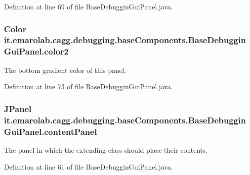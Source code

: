 Definition at line 69 of file Base\-Debuggin\-Gui\-Panel.\-java.

\hypertarget{classit_1_1emarolab_1_1cagg_1_1debugging_1_1baseComponents_1_1BaseDebugginGuiPanel_a97cc1e5698f78bfc568be30173e15d65}{
\subsubsection[{color2}]{\setlength{\rightskip}{0pt plus 5cm}Color it.\-emarolab.\-cagg.\-debugging.\-base\-Components.\-Base\-Debuggin\-Gui\-Panel.\-color2\hspace{0.3cm}{\ttfamily [protected]}}}\label{classit_1_1emarolab_1_1cagg_1_1debugging_1_1baseComponents_1_1BaseDebugginGuiPanel_a97cc1e5698f78bfc568be30173e15d65}
The bottom gradient color of this panel. 

Definition at line 73 of file Base\-Debuggin\-Gui\-Panel.\-java.

\hypertarget{classit_1_1emarolab_1_1cagg_1_1debugging_1_1baseComponents_1_1BaseDebugginGuiPanel_a20dd485862372d4f536e47f201386c32}{
\subsubsection[{content\-Panel}]{\setlength{\rightskip}{0pt plus 5cm}J\-Panel it.\-emarolab.\-cagg.\-debugging.\-base\-Components.\-Base\-Debuggin\-Gui\-Panel.\-content\-Panel\hspace{0.3cm}{\ttfamily [protected]}}}\label{classit_1_1emarolab_1_1cagg_1_1debugging_1_1baseComponents_1_1BaseDebugginGuiPanel_a20dd485862372d4f536e47f201386c32}
The panel in which the extending class should place their contents. 

Definition at line 61 of file Base\-Debuggin\-Gui\-Panel.\-java.


